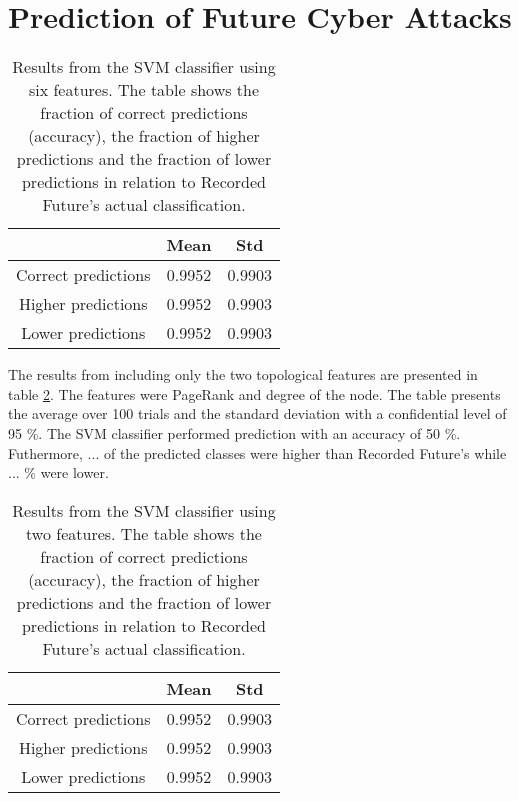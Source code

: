 \section{Prediction of Future Cyber Attacks}


\begin{table}[h!]
    \centering
    \caption{Results from the SVM classifier using six features. The table shows the fraction of correct predictions (accuracy), the fraction of higher predictions and the fraction of lower predictions in relation to Recorded Future's actual classification.}
    \begin{tabular}{|c|c|c|}
    \hline
        ~   & Mean & Std  \\ \hline
        Correct predictions & 0.9952 &  0.9903 \\
        Higher predictions  & 0.9952 &  0.9903\\
        Lower predictions   & 0.9952 &  0.9903\\ \hline
    \end{tabular}
    \label{IpRes}
\end{table}

The results from including only the two topological features are presented in table \ref{IpRes2Feat}. The features were PageRank and degree of the node. The table presents the average over 100 trials and the standard deviation with a confidential level of 95 \%. The SVM classifier performed prediction with an accuracy of 50 \%. Futhermore, ... of the predicted classes were higher than Recorded Future's while ... \% were lower. 

\begin{table}[h!]
    \centering
    \caption{Results from the SVM classifier using two features. The table shows the fraction of correct predictions (accuracy), the fraction of higher predictions and the fraction of lower predictions in relation to Recorded Future's actual classification.}
    \begin{tabular}{|c|c|c|}
    \hline
        ~   & Mean & Std  \\ \hline
        Correct predictions & 0.9952 &  0.9903 \\
        Higher predictions  & 0.9952 &  0.9903\\
        Lower predictions   & 0.9952 &  0.9903\\ \hline
    \end{tabular}
    \label{IpRes2Feat}
\end{table}

